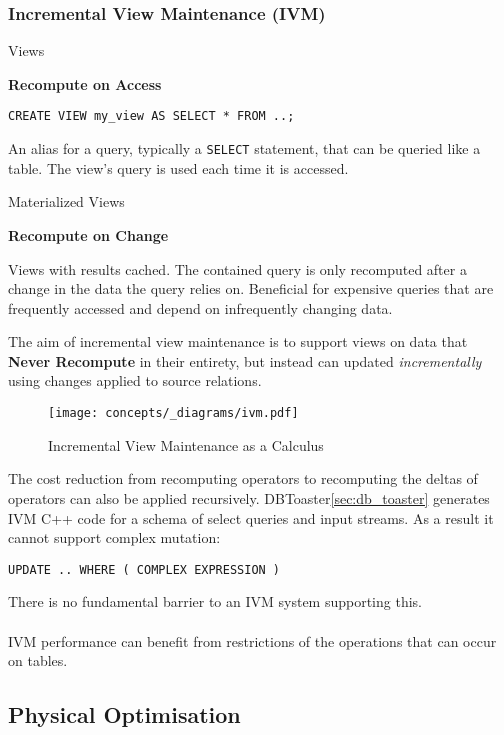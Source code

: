 \subsubsection{Incremental View Maintenance (IVM)}
\begin{tcbraster}[raster columns=2,raster equal height]
    \begin{definitionbox}{Views}
        \centerline{\textbf{Recompute on Access}}
        \begin{verbatim}
CREATE VIEW my_view AS SELECT * FROM ..;            
        \end{verbatim}
        An alias for a query, typically a \texttt{SELECT} statement, that can be queried like a table. The view's query is used each time it is accessed.\cite{Postgres16Docs}
    \end{definitionbox}
    \begin{definitionbox}{Materialized Views}
        \centerline{\textbf{Recompute on Change}}
        Views with results cached. The contained query is only recomputed after a change in the data the query relies on. Beneficial for expensive queries that are frequently accessed and depend on infrequently changing data.
    \end{definitionbox}
\end{tcbraster}
\noindent
The aim of incremental view maintenance is to support views on data that \textbf{Never Recompute} in their entirety, but instead can updated \textit{incrementally} using changes applied to source relations.
\begin{figure}[h!]
    \centering
    \texttt{[image: concepts/\_diagrams/ivm.pdf]}
    \caption{Incremental View Maintenance as a Calculus}
\end{figure}
\noindent
The cost reduction from recomputing operators to recomputing the deltas of operators can also be applied recursively. 
DBToaster\ref{sec:db_toaster} generates IVM C++ code for a schema of select queries and input streams. As a 
result it cannot support complex mutation:
\begin{verbatim}
UPDATE .. WHERE ( COMPLEX EXPRESSION )
\end{verbatim}
\noindent
There is no fundamental barrier to an IVM system supporting this.
\\
\\ IVM performance can benefit from restrictions of the operations that can occur on tables.
\subsection{Physical Optimisation}
